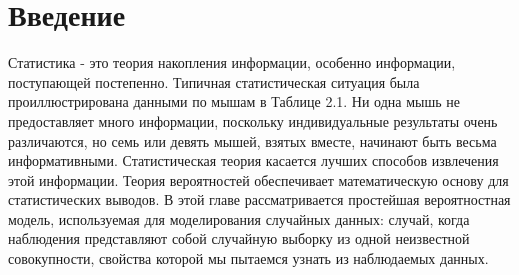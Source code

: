 \section{Введение}

Статистика - это теория накопления информации, особенно информации, поступающей постепенно. Типичная статистическая ситуация была проиллюстрирована данными по мышам в Таблице 2.1. Ни одна мышь не предоставляет много информации, поскольку индивидуальные результаты очень различаются, но семь или девять мышей, взятых вместе, начинают быть весьма информативными. Статистическая теория касается лучших способов извлечения этой информации. Теория вероятностей обеспечивает математическую основу для статистических выводов. В этой главе рассматривается простейшая вероятностная модель, используемая для моделирования случайных данных: случай, когда наблюдения представляют собой случайную выборку из одной неизвестной совокупности, свойства которой мы пытаемся узнать из наблюдаемых данных. 